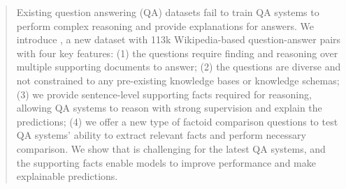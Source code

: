 \begin{abstract}
Existing question answering (QA) datasets fail to train QA systems to perform complex reasoning and provide explanations for answers.
We introduce \datasetname
, a new dataset with 113k Wikipedia-based question-answer pairs
with four key features:
(1) the questions require finding and reasoning over multiple supporting documents to answer;
(2) the questions are diverse and not constrained to any pre-existing knowledge bases or knowledge schemas;
(3) we provide sentence-level supporting facts required for reasoning, allowing QA systems to reason with strong supervision and explain the predictions;
(4) we offer a new type of factoid comparison questions to test QA systems' ability to extract relevant facts and perform necessary comparison.
We show that \datasetname{} is challenging for the latest QA systems, and the supporting facts enable models to improve performance and make explainable predictions.
\end{abstract}
